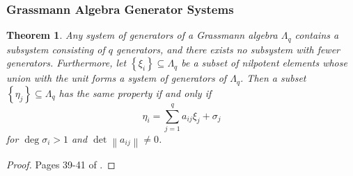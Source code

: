 \documentclass{article}
\newtheorem{theorem}{Theorem}
\theoremstyle{definition}
\begin{document}
\subsubsection{Grassmann Algebra Generator Systems}

\begin{theorem}
    \label{thm:grassmann_generators}
    Any system of generators of a Grassmann algebra $\Lambda_q$ contains a subsystem consisting of $q$ generators, and there exists no subsystem with fewer generators. Furthermore, let $\left\{ \xi_i \right\} \subseteq \Lambda_q$ be a subset of nilpotent elements whose union with the unit forms a system of generators of $\Lambda_q$. Then a subset $\left\{ \eta_j \right\} \subseteq \Lambda_q$ has the same property if and only if
    \begin{equation*}
        \eta_i = \sum_{j = 1}^{q} a_{ij} \xi_j + \sigma_j
    \end{equation*}
    for $\deg \sigma_i > 1$ and $\det \left\| a_{ij} \right\| \neq 0$.
\end{theorem}
\begin{proof}
    Pages 39-41 of \cite{berezin_introduction_1987}.
\end{proof}
\end{document}

